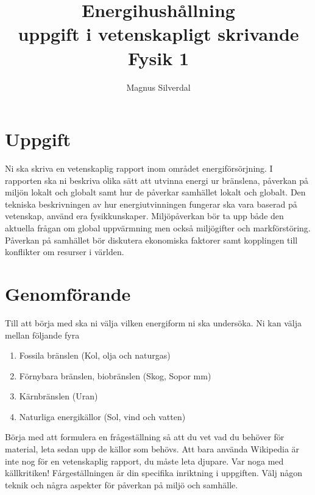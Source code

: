 \documentclass[11pt]{article}
\title{Energihushållning \protect\\ uppgift i vetenskapligt skrivande\protect\\Fysik 1}
\author{Magnus Silverdal}
\begin{document}
    \maketitle
    \section{Uppgift}
    Ni ska skriva en vetenskaplig rapport inom området energiförsörjning. I rapporten ska ni beskriva
    olika sätt att utvinna energi ur bränslena, påverkan på miljön lokalt och globalt samt hur de
    påverkar samhället lokalt och globalt.
    Den tekniska beskrivningen av hur energiutvinningen fungerar ska vara baserad på vetenskap,
    använd era fysikkunskaper.
    Miljöpåverkan bör ta upp både den aktuella frågan om global uppvärmning men också miljögifter
    och markförstöring.
    Påverkan på samhället bör diskutera ekonomiska faktorer
    samt kopplingen till konflikter om resurser i världen.
    \section{Genomförande}
    Till att börja med ska ni välja vilken energiform ni ska undersöka. Ni kan välja mellan följande fyra
    \begin{enumerate}
        \item Fossila bränslen (Kol, olja och naturgas)
        \item Förnybara bränslen, biobränslen (Skog, Sopor mm)
        \item Kärnbränslen (Uran)
        \item Naturliga energikällor (Sol, vind och vatten)
    \end{enumerate}
    Börja med att formulera en frågeställning så att du vet vad du behöver för material, leta sedan upp
    de källor som behövs. Att bara använda Wikipedia är inte nog för en vetenskaplig rapport, du måste
    leta djupare. Var noga med källkritiken! Fårgeställningen är din specifika inriktning i uppgiften.
    Välj någon teknik och några aspekter för påverkan på miljö och samhälle.
\end{document}
